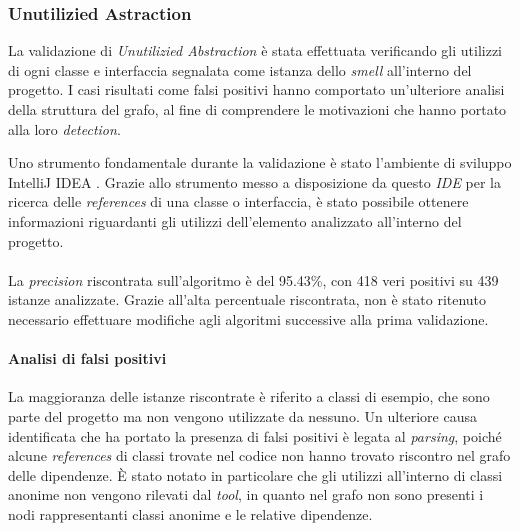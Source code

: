     \subsubsection{Unutilizied Astraction}
        La validazione di \textit{Unutilizied Abstraction} è stata effettuata verificando gli utilizzi di ogni classe e interfaccia segnalata come istanza dello \textit{smell} all'interno del progetto. I casi risultati come falsi positivi hanno comportato un'ulteriore analisi della struttura del grafo, al fine di comprendere le motivazioni che hanno portato alla loro \textit{detection}.
        
        Uno strumento fondamentale durante la validazione è stato l'ambiente di sviluppo IntelliJ IDEA \cite{intelliJ}. Grazie allo strumento messo a disposizione da questo \textit{IDE} per la ricerca delle \textit{references} di una classe o interfaccia, è stato possibile ottenere informazioni riguardanti gli utilizzi dell'elemento analizzato all'interno del progetto.\\
        \\
        La \textit{precision} riscontrata sull'algoritmo è del 95.43\%, con 418 veri positivi su 439 istanze analizzate. Grazie all'alta percentuale riscontrata, non è stato ritenuto necessario effettuare modifiche agli algoritmi successive alla prima validazione.
        
        \paragraph{Analisi di falsi positivi}
            La maggioranza delle istanze riscontrate è riferito a classi di esempio, che sono parte del progetto ma non vengono utilizzate da nessuno.
            Un ulteriore causa identificata che ha portato la presenza di falsi positivi è legata al \textit{parsing}, poiché alcune \textit{references} di classi trovate nel codice non hanno trovato riscontro nel grafo delle dipendenze. È stato notato in particolare che gli utilizzi all'interno di classi anonime non vengono rilevati dal \textit{tool}, in quanto nel grafo non sono presenti i nodi rappresentanti classi anonime e le relative dipendenze.
            
